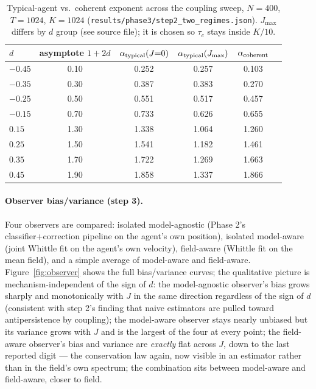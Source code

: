 \documentclass[11pt]{article}
\newcommand{\code}[1]{\texttt{#1}}
\begin{document}
\begin{table}[htbp]
\centering
\caption{Typical-agent vs.\ coherent exponent across the coupling sweep,
$N{=}400$, $T{=}1024$, $K{=}1024$
(\code{results/phase3/step2\_two\_regimes.json}). $J_{\max}$ differs by $d$
group (see source file); it is chosen so $\tau_c$ stays inside $K/10$.}
\label{tab:step2}
\begin{tabular}{lccccc}
\toprule
$d$ & asymptote $1{+}2d$ & $\alpha_{\rm typical}(J{=}0)$ & $\alpha_{\rm typical}(J_{\max})$ & $\alpha_{\rm coherent}$ \\
\midrule
$-0.45$ & 0.10 & 0.252 & 0.257 & 0.103 \\
$-0.35$ & 0.30 & 0.387 & 0.383 & 0.270 \\
$-0.25$ & 0.50 & 0.551 & 0.517 & 0.457 \\
$-0.15$ & 0.70 & 0.733 & 0.626 & 0.655 \\
$0.15$ & 1.30 & 1.338 & 1.064 & 1.260 \\
$0.25$ & 1.50 & 1.541 & 1.182 & 1.461 \\
$0.35$ & 1.70 & 1.722 & 1.269 & 1.663 \\
$0.45$ & 1.90 & 1.858 & 1.337 & 1.866 \\
\bottomrule
\end{tabular}
\end{table}

\paragraph{Observer bias/variance (step 3).} Four observers are compared:
isolated model-agnostic (Phase 2's classifier+correction pipeline on the
agent's own position), isolated model-aware (joint Whittle fit on the
agent's own velocity), field-aware (Whittle fit on the mean field), and a
simple average of model-aware and field-aware. Figure~\ref{fig:observer}
shows the full bias/variance curves; the qualitative picture is
mechanism-independent of the sign of $d$: the model-agnostic observer's bias
grows sharply and monotonically with $J$ in the same direction regardless of
the sign of $d$ (consistent with step 2's finding that naive estimators are
pulled toward antipersistence by coupling); the model-aware observer stays
nearly unbiased but its variance grows with $J$ and is the largest of the
four at every point; the field-aware observer's bias and variance are
\emph{exactly} flat across $J$, down to the last reported digit --- the
conservation law again, now visible in an estimator rather than in the
field's own spectrum; the combination sits between model-aware and
field-aware, closer to field.
\end{document}
